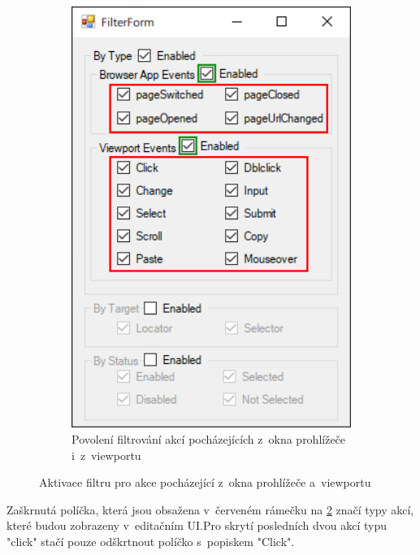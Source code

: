 \documentclass[12pt, a4paper, twoside]{article}
\begin{document}
\begin{figure}[H]
\begin{minipage}{0.47\textwidth}
\begin{subfigure}[t]{1.0\textwidth}
			\end{subfigure}	
		\end{minipage}
		\hfill
		\textrightarrow
		\hfill
		\begin{minipage}{0.47\textwidth}
			\begin{subfigure}[t]{1.0\textwidth}
				\includegraphics[width=1.0\textwidth, right]{filterForm3.png}
				\caption{Povolení filtrování akcí pocházejících z~okna prohlížeče i~z~viewportu}
				\label{subfig:filterEnableForAllTypes}
			\end{subfigure}	
		\end{minipage}
		\caption{Aktivace filtru pro akce pocházející z~okna prohlížeče a~viewportu}
	\end{figure}
	Zaškrnutá políčka, která jsou obsažena v~červeném rámečku na \cref{subfig:filterEnableForAllTypes} značí typy akcí, které budou zobrazeny v~editačním UI.\newpage Pro skrytí posledních dvou akcí typu "click" stačí pouze odškrtnout políčko s~popiskem "Click".
\end{document}
